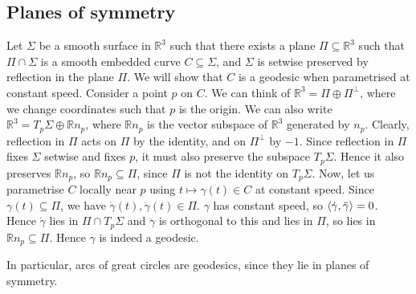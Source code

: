 \documentclass[a4paper]{article}
\begin{document}
\subsection{Planes of symmetry}
Let \( \Sigma \) be a smooth surface in \( \mathbb R^3 \) such that there exists a plane \( \Pi \subseteq \mathbb R^3 \) such that \( \Pi \cap \Sigma \) is a smooth embedded curve \( C \subseteq \Sigma \), and \( \Sigma \) is setwise preserved by reflection in the plane \( \Pi \).
We will show that \( C \) is a geodesic when parametrised at constant speed.
Consider a point \( p \) on \( C \).
We can think of \( \mathbb R^3 = \Pi \oplus \Pi^\perp \), where we change coordinates such that \( p \) is the origin.
We can also write \( \mathbb R^3 = T_p \Sigma \oplus \mathbb R n_p \), where \( \mathbb R n_p \) is the vector subspace of \( \mathbb R^3 \) generated by \( n_p \).
Clearly, reflection in \( \Pi \) acts on \( \Pi \) by the identity, and on \( \Pi^\perp \) by \( -1 \).
Since reflection in \( \Pi \) fixes \( \Sigma \) setwise and fixes \( p \), it must also preserve the subspace \( T_p \Sigma \).
Hence it also preserves \( \mathbb R n_p \), so \( \mathbb R n_p \subseteq \Pi \), since \( \Pi \) is not the identity on \( T_p \Sigma \).
Now, let us parametrise \( C \) locally near \( p \) using \( t \mapsto \gamma(t) \in C \) at constant speed.
Since \( \gamma(t) \subseteq \Pi \), we have \( \dot \gamma(t), \ddot \gamma(t) \in \Pi \).
\( \gamma \) has constant speed, so \( \left\langle{\dot \gamma, \ddot \gamma}\right\rangle = 0 \).
Hence \( \dot \gamma \) lies in \( \Pi \cap T_p \Sigma \) and \( \ddot \gamma \) is orthogonal to this and lies in \( \Pi \), so lies in \( \mathbb R n_p \subseteq \Pi \).
Hence \( \gamma \) is indeed a geodesic.

In particular, arcs of great circles are geodesics, since they lie in planes of symmetry.
\end{document}
